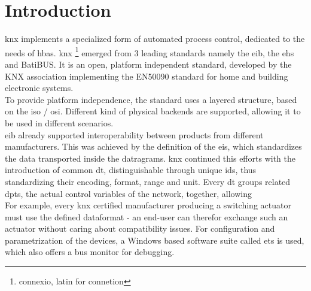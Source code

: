 \section{Introduction}

\gls{knx} implements a specialized form of automated process control, dedicated to the needs of \gls{hbas}. \gls{knx} \footnote{connexio, latin for connetion}
emerged from 3 leading standards namely the \gls{eib}, the \gls{ehs} and BatiBUS. It is an open, platform independent standard,
developed by the KNX association implementing the EN50090 standard for home and building electronic systems.
\\
To provide platform independence, the standard uses a layered structure, based on the \gls{iso} / \gls{osi}. Different kind of physical backends are supported,
allowing it to be used in different scenarios.
\\
\gls{eib} already supported interoperability between products from different manufacturers. This was achieved by
the definition of the \gls{eis}, which standardizes
the data transported inside the datragrams. \gls{knx} continued this efforts with the introduction of common \gls{dt}, distinguishable through unique ids, thus
standardizing their encoding, format, range and unit.
Every \gls{dt} groups related \glspl{dpt}, the actual control variables of the network, together, allowing 
\\
For example, every \gls{knx} 
certified manufacturer producing a switching actuator must use the defined dataformat - an end-user can therefor exchange such an actuator without caring
about compatibility issues. For configuration and parametrization of the devices, a Windows based software suite called \gls{ets} is used, which also offers
a bus monitor for debugging.
